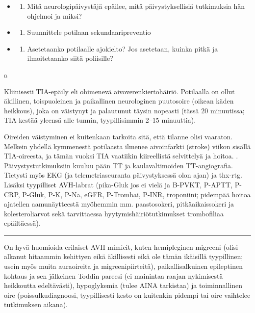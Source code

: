 \documentclass[
]{book}
\providecommand{\tightlist}{%
  \setlength{\itemsep}{0pt}\setlength{\parskip}{0pt}}
\begin{document}
\begin{itemize}
\tightlist
\item
  \begin{enumerate}
  \def\labelenumi{\alph{enumi}.}
  \tightlist
  \item
    Mitä neurologipäivystäjä epäilee, mitä päivystyksellisiä tutkimuksia hän ohjelmoi ja miksi?
  \end{enumerate}
\item
  \begin{enumerate}
  \def\labelenumi{\alph{enumi}.}
  \setcounter{enumi}{1}
  \tightlist
  \item
    Suunnittele potilaan sekundaaripreventio
  \end{enumerate}
\item
  \begin{enumerate}
  \def\labelenumi{\alph{enumi}.}
  \setcounter{enumi}{2}
  \tightlist
  \item
    Asetetaanko potilaalle ajokielto? Jos asetetaan, kuinka pitkä ja ilmoitetaanko siitä poliisille?
  \end{enumerate}
\end{itemize}

a

Kliinisesti TIA-epäily eli ohimenevä aivoverenkiertohäiriö. Potilaalla on ollut äkillinen, toispuoleinen ja paikallinen neurologinen puutosoire (oikean käden heikkous), joka on väistynyt ja palautunut täysin nopeasti (tässä 20 minuutissa; TIA kestää yleensä alle tunnin, tyypillisimmin 2--15 minuuttia).

Oireiden väistyminen ei kuitenkaan tarkoita sitä, että tilanne olisi vaaraton. Melkein yhdellä kymmenestä potilaasta ilmenee aivoinfarkti (stroke) viikon sisällä TIA-oireesta, ja tämän vuoksi TIA vaatiikin kiireellistä selvittelyä ja hoitoa. . Päivystystutkimuksiin kuuluu pään TT ja kaulavaltimoiden TT-angiografia. Tietysti myös EKG (ja telemetriaseuranta päivystyksessä olon ajan) ja thx-rtg. Lisäksi tyypilliset AVH-labrat (pika-Gluk jos ei vielä ja B-PVKT, P-APTT, P-CRP, P-Gluk, P-K, P-Na, eGFR, P-Trombai, P-INR, troponiini; pidempää hoitoa ajatellen aamunäytteestä myöhemmin mm. paastosokeri, pitkäaikaissokeri ja kolesteroliarvot sekä tarvittaessa hyytymishäiriötutkimukset trombofiliaa epäiltäessä).

\begin{center}\rule{0.5\linewidth}{0.5pt}\end{center}

On hyvä huomioida erilaiset AVH-mimicit, kuten hemipleginen migreeni (olisi alkanut hitaammin kehittyen eikä äkillisesti eikä ole tämän ikäisillä tyypillinen; usein myös muita auraoireita ja migreenipiirteitä), paikallisalkuinen epileptinen kohtaus ja sen jälkeinen Toddin pareesi (ei mainintaa raajan nykimisestä heikkoutta edeltävästi), hypoglykemia (tulee AINA tarkistaa) ja toiminnallinen oire (poissulkudiagnoosi, tyypillisesti kesto on kuitenkin pidempi tai oire vaihtelee tutkimuksen aikana).
\end{document}

